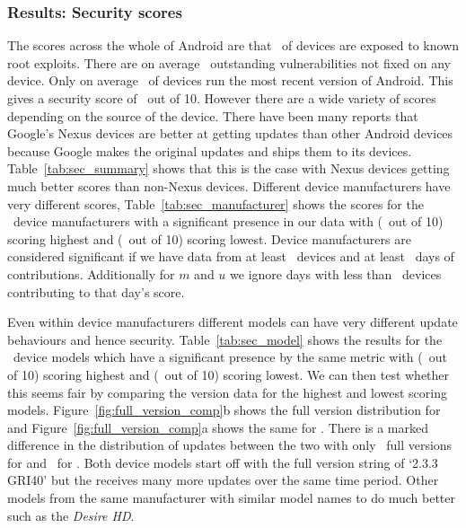 \subsubsection{Results: Security scores}
The scores across the whole of Android are that \daMeanInsecurityPerc\ of devices are exposed to known root exploits.
There are on average \daMeanOutstandingVulnerabilities\ outstanding vulnerabilities not fixed on any device.
Only on average \daUpdatednessPerc\ of devices run the most recent version of Android.
This gives a security score of \daSecurityScore\ out of 10.
\daTabSecScoressummary
However there are a wide variety of scores depending on the source of the device.
There have been many reports that Google's Nexus devices are better at getting updates than other Android devices because Google makes the original updates and ships them to its devices.
Table~\ref{tab:sec_summary} shows that this is the case with Nexus devices getting much better scores than non-Nexus devices.
\daTabSecScoresmanufacturer
Different device manufacturers have very different scores, Table~\ref{tab:sec_manufacturer} shows the scores for the \daNumSigManufacturers\ device manufacturers with a significant presence in our data with \emph{\daSecScoreBestmanufacturer} (\daSecScoreBestmanufacturerScore\ out of 10) scoring highest and \emph{\daSecScoreWorstmanufacturer} (\daSecScoreWorstmanufacturerScore\ out of 10) scoring lowest.
Device manufacturers are considered significant if we have data from at least \daSigNumDevices\ devices and at least \daSigNumDeviceDays\ days of contributions.
Additionally for $m$ and $u$ we ignore days with less than \daSigNumDevicesDay\ devices contributing to that day's score.

\daTabSecScoresmodel
Even within device manufacturers different models can have very different update behaviours and hence security.
Table~\ref{tab:sec_model} shows the results for the \daNumSigModels\ device models which have a significant presence by the same metric with \emph{\daSecScoreBestmodel} (\daSecScoreBestmodelScore\ out of 10) scoring highest and \emph{\daSecScoreWorstmodel} (\daSecScoreWorstmodelScore\ out of 10) scoring lowest.
We can then test whether this seems fair by comparing the version data for the highest and lowest scoring models.
Figure~\ref{fig:full_version_comp}b shows the full version distribution for \emph{\daSecScoreWorstmodel} and Figure~\ref{fig:full_version_comp}a shows the same for \emph{\daSecScoreBestmodel}.
There is a marked difference in the distribution of updates between the two with only \daSecScoreWorstmodelNumFullVersions\ full versions for \emph{\daSecScoreWorstmodel} and \daSecScoreBestmodelNumFullVersions\ for \emph{\daSecScoreBestmodel}.
Both device models start off with the full version string of `2.3.3 GRI40' but the \emph{\daSecScoreBestmodel} receives many more updates over the same time period.
Other models from the same manufacturer with similar model names to \emph{\daSecScoreWorstmodel} do much better such as the \emph{Desire HD}.

